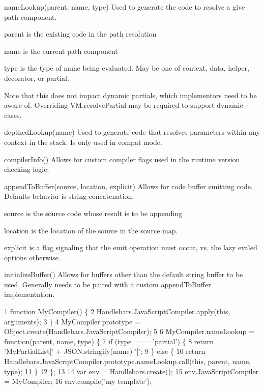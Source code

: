 \begin{DoxyItemize}
\item {\ttfamily name\+Lookup(parent, name, type)} Used to generate the code to resolve a give path component.
\begin{DoxyItemize}
\item {\ttfamily parent} is the existing code in the path resolution
\item {\ttfamily name} is the current path component
\item {\ttfamily type} is the type of name being evaluated. May be one of {\ttfamily context}, {\ttfamily data}, {\ttfamily helper}, {\ttfamily decorator}, or {\ttfamily partial}.
\end{DoxyItemize}

Note that this does not impact dynamic partials, which implementors need to be aware of. Overriding {\ttfamily V\+M.\+resolve\+Partial} may be required to support dynamic cases.
\item {\ttfamily depthed\+Lookup(name)} Used to generate code that resolves parameters within any context in the stack. Is only used in {\ttfamily compat} mode.
\item {\ttfamily compiler\+Info()} Allows for custom compiler flags used in the runtime version checking logic.
\item {\ttfamily append\+To\+Buffer(source, location, explicit)} Allows for code buffer emitting code. Defaults behavior is string concatenation.
\begin{DoxyItemize}
\item {\ttfamily source} is the source code whose result is to be appending
\item {\ttfamily location} is the location of the source in the source map.
\item {\ttfamily explicit} is a flag signaling that the emit operation must occur, vs. the lazy evaled options otherwise.
\end{DoxyItemize}
\item {\ttfamily initialize\+Buffer()} Allows for buffers other than the default string buffer to be used. Generally needs to be paired with a custom {\ttfamily append\+To\+Buffer} implementation.
\end{DoxyItemize}


\begin{DoxyCode}
1 function MyCompiler() \{
2   Handlebars.JavaScriptCompiler.apply(this, arguments);
3 \}
4 MyCompiler.prototype = Object.create(Handlebars.JavaScriptCompiler);
5 
6 MyCompiler.nameLookup = function(parent, name, type) \{
7   if (type === 'partial') \{
8     return 'MyPartialList[' + JSON.stringify(name) ']';
9   \} else \{
10     return Handlebars.JavaScriptCompiler.prototype.nameLookup.call(this, parent, name, type);
11   \}
12 \};
13 
14 var env = Handlebars.create();
15 env.JavaScriptCompiler = MyCompiler;
16 env.compile('my template');
\end{DoxyCode}
 